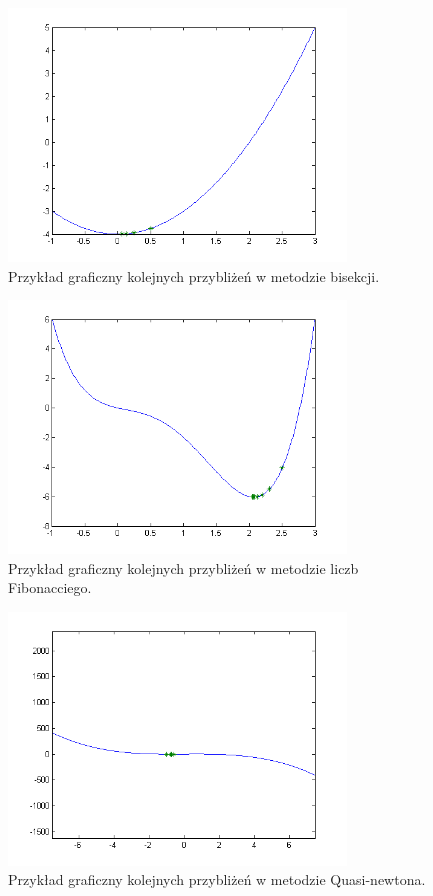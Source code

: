 \documentclass{classrep}
\begin{document}
	\begin{figure}[H]
  \centering
    \includegraphics[width=0.8\textwidth]{b_eps01}
	 \caption{Przykład graficzny kolejnych przybliżeń w metodzie bisekcji.}
 \end{figure}
 \begin{figure}[H]
  \centering
    \includegraphics[width=0.8\textwidth]{f_eps001}
	 \caption{Przykład graficzny kolejnych przybliżeń w metodzie liczb Fibonacciego.}
 \end{figure}
 \begin{figure}[H]
  \centering
    \includegraphics[width=0.8\textwidth]{q_eps0001}
	 \caption{Przykład graficzny kolejnych przybliżeń w metodzie Quasi-newtona.}
 \end{figure}
 
\end{document}
